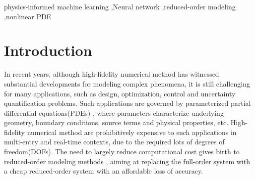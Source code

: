 \documentclass[preprint, 10pt]{elsarticle}
\begin{document}
\begin{frontmatter}
\begin{abstract}
\end{abstract}

\begin{keyword}
   physics-informed machine learning \sep Neural network  \sep reduced-order modeling \sep nonlinear PDE



\end{keyword}

\end{frontmatter}


\section{Introduction}
In recent years, although high-fidelity numerical method has witnessed substantial developments for modeling complex phenomena, it is still challenging for many applications, such as design, optimization, control and uncertainty quantification problems. Such applications are governed by parameterized partial differential equations(PDEs) \cite{hesthaven2016certified, quarteroni2015reduced}, where parameters characterize underlying geometry, boundary conditions, source terms and physical properties, etc. High-fidelity numerical method are prohibitively expensive to such applications in multi-entry and real-time contexts, due to the required lots of degrees of freedom(DOFs).
The need to largely reduce computational cost gives birth to reduced-order modeling methods \cite{lucia2004reduced}, aiming at replacing the full-order system with a cheap reduced-order system with an affordable loss of accuracy.
\end{document}
